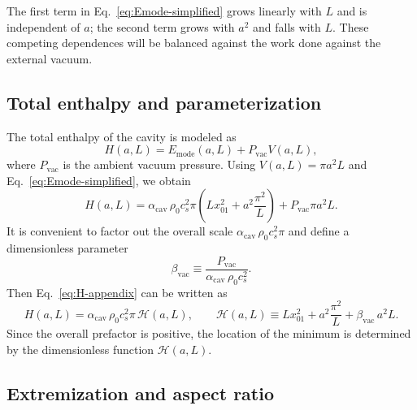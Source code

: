\documentclass[11pt]{article}
\newcommand{\acav}{\alpha_{\mathrm{cav}}}
\newcommand{\bvac}{\beta_{\mathrm{vac}}}
\begin{document}
The first term in Eq.~\eqref{eq:Emode-simplified} grows linearly with $L$ and is independent of $a$; the second term grows with $a^2$ and falls with $L$.  These competing dependences will be balanced against the work done against the external vacuum.

\subsection{Total enthalpy and parameterization}

The total enthalpy of the cavity is modeled as
\begin{equation}
H(a,L) = E_{\mathrm{mode}}(a,L) + P_{\mathrm{vac}} V(a,L),
\end{equation}
where $P_{\mathrm{vac}}$ is the ambient vacuum pressure.  Using $V(a,L) = \pi a^2 L$ and Eq.~\eqref{eq:Emode-simplified}, we obtain
\begin{equation}
H(a,L)
= \acav\,\rho_0 c_s^2 \pi
  \left(L x_{01}^2 + a^2 \frac{\pi^2}{L}\right)
+ P_{\mathrm{vac}} \pi a^2 L.
\label{eq:H-appendix}
\end{equation}
It is convenient to factor out the overall scale $\acav\,\rho_0 c_s^2 \pi$ and define a dimensionless parameter
\begin{equation}
\bvac \equiv \frac{P_{\mathrm{vac}}}{\acav\,\rho_0 c_s^2}.
\end{equation}
Then Eq.~\eqref{eq:H-appendix} can be written as
\begin{equation}
H(a,L)
= \acav\,\rho_0 c_s^2 \pi\,
  \mathcal{H}(a,L),
\qquad
\mathcal{H}(a,L)
\equiv L x_{01}^2 + a^2 \frac{\pi^2}{L}
     + \bvac\,a^2 L.
\label{eq:H-dimensionless}
\end{equation}
Since the overall prefactor is positive, the location of the minimum is determined by the dimensionless function $\mathcal{H}(a,L)$.

\subsection{Extremization and aspect ratio}
\end{document}
